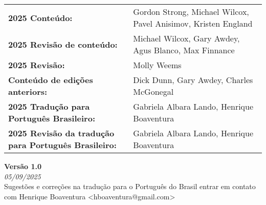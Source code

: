 \begin{titlepage}
        \vspace{0.5cm}

        \begin{tabular}{ p{6.5cm} p{11.5cm} }
            \textbf{2025 Conteúdo:}	& Gordon Strong, Michael Wilcox, Pavel Anisimov, Kristen England \\
            \textbf{2025 Revisão de conteúdo:} & Michael Wilcox, Gary Awdey, Agus Blanco, Max Finnance \\
            \textbf{2025 Revisão:} & Molly Weems \\
            \textbf{Conteúdo de edições anteriors:} & Dick Dunn, Gary Awdey, Charles McGonegal \\
            \textbf{2025 Tradução para Português Brasileiro:} & Gabriela Albara Lando, Henrique Boaventura \\
            \textbf{2025 Revisão da tradução para Português Brasileiro:} & Gabriela Albara Lando, Henrique Boaventura
        \end{tabular}
        \vspace{0.5cm}
        \textbf{Versão 1.0}\\
        \footnotesize{\textit{05/09/2025}}\\
        \vspace{0.4cm}
        \footnotesize{Sugestões e correções na tradução para o Português do Brasil entrar em contato com Henrique Boaventura <hboaventura@gmail.com>}

\end{titlepage}

